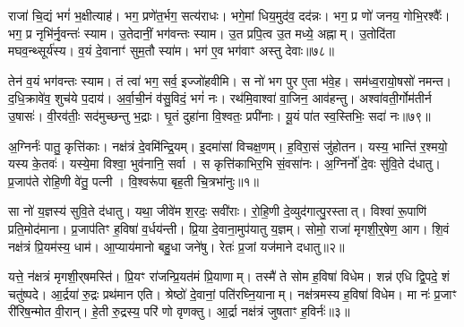 राजा॑ चि॒द्यं भगं॑ भ॒क्षीत्याह॑।
भग॒ प्रणे॑त॒र्भग॒ सत्य॑राधः।
भगे॒मां धिय॒मुद॑व॒ दद॑न्नः।
भग॒ प्र णो॑ जनय॒ गोभि॒रश्वैः᳚।
भग॒ प्र नृभि॑र्नृ॒वन्तः॑ स्याम।
उ॒तेदानीं॒ भग॑वन्तः स्याम।
उ॒त प्रपि॒त्व उ॒त मध्ये॒ अह्नाम्।
उ॒तोदि॑ता मघव॒न्थ्सूर्य॑स्य।
व॒यं दे॒वानाꣳ॑ सुम॒तौ स्या॑म।
भग॑ ए॒व भग॑वाꣳ अस्तु देवाः॥७८॥

तेन॑ व॒यं भग॑वन्तः स्याम।
तं त्वा॑ भग॒ सर्व॒ इज्जो॑हवीमि।
स नो॑ भग पुर ए॒ता भ॑वे॒ह।
सम॑ध्व॒रायो॒षसो॑ नमन्त।
द॒धि॒क्रावे॑व॒ शुच॑ये प॒दाय॑।
अ॒र्वा॒ची॒नं व॑सु॒विदं॒ भगं॑ नः।
रथ॑मि॒वाश्वा॑ वा॒जिन॒ आव॑हन्तु।
अश्वा॑वती॒र्गोम॑तीर्न उ॒षासः॑।
वी॒रव॑तीः॒ सद॑मुच्छन्तु भ॒द्राः।
घृ॒तं दुहा॑ना वि॒श्वतः॒ प्रपी॑नाः।
यू॒यं पा॑त स्व॒स्तिभिः॒ सदा॑ नः॥७९॥\anuvakamend[वि॒च॒क्ष॒णा वि॑चर्तु॒रꣳ शर्म॒न्नधि॑ वि॒सर्ज॑नाय॒ ब्रह्म॒ वनं॒ ब्रह्म॒ स वृ॒क्ष आ॑सीत्तु॒रश्चि॑द्देवाः॒ प्रपी॑ना॒ एकं॑ च]
\clearpage

\setcounter{anuvakam}{0}

अ॒ग्निर्नः॑ पातु॒ कृत्ति॑काः।
नक्ष॑त्रं दे॒वमि॑न्द्रि॒यम्।
इ॒दमा॑सां विचक्ष॒णम्।
ह॒विरा॒सं जु॑होतन।
यस्य॒ भान्ति॑ र॒श्मयो॒ यस्य के॒तवः॑।
यस्ये॒मा विश्वा॒ भुव॑नानि॒ सर्वा।
स कृत्ति॑काभिर॒भि सं॒वसा॑नः।
अ॒ग्निर्नो॑ दे॒वः सु॑वि॒ते द॑धातु।
प्र॒जाप॑ते रोहि॒णी वे॑तु॒ पत्नी।
वि॒श्वरू॑पा बृह॒ती चि॒त्रभा॑नुः॥१॥

सा नो॑ य॒ज्ञस्य॑ सुवि॒ते द॑धातु।
यथा॒ जीवे॑म श॒रदः॒ सवी॑राः।
रो॒हि॒णी दे॒व्युद॑गात्पु॒रस्तात्।
विश्वा॑ रू॒पाणि॑ प्रति॒मोद॑माना।
प्र॒जाप॑तिꣳ ह॒विषा॑ व॒र्धय॑न्ती।
प्रि॒या दे॒वाना॒मुप॑यातु य॒ज्ञम्।
सोमो॒ राजा॑ मृगशी॒र्॒षेण॒ आग\sn{}।
शि॒वं नक्ष॑त्रं प्रि॒यम॑स्य॒ धाम॑।
आ॒प्याय॑मानो बहु॒धा जने॑षु।
रेतः॑ प्र॒जां यज॑माने दधातु॥२॥

यत्ते॒ न॑क्षत्रं मृगशी॒र्‌\mbox{}षमस्ति॑।
प्रि॒यꣳ रा॑जन्प्रि॒यत॑मं प्रि॒याणाम्।
तस्मै॑ ते सोम ह॒विषा॑ विधेम।
शन्न॑ एधि द्वि॒पदे॒ शं चतु॑ष्पदे।
आ॒र्द्रया॑ रु॒द्रः प्रथ॑मान एति।
श्रेष्ठो॑ दे॒वानां॒ पति॑रघ्नि॒यानाम्।
नक्ष॑त्रमस्य ह॒विषा॑ विधेम।
मा नः॑ प्र॒जाꣳ री॑रिष॒न्मोत वी॒रान्।
हे॒ती रु॒द्रस्य॒ परि॑ णो वृणक्तु।
आ॒र्द्रा नक्ष॑त्रं जुषताꣳ ह॒विर्नः॑॥३॥

